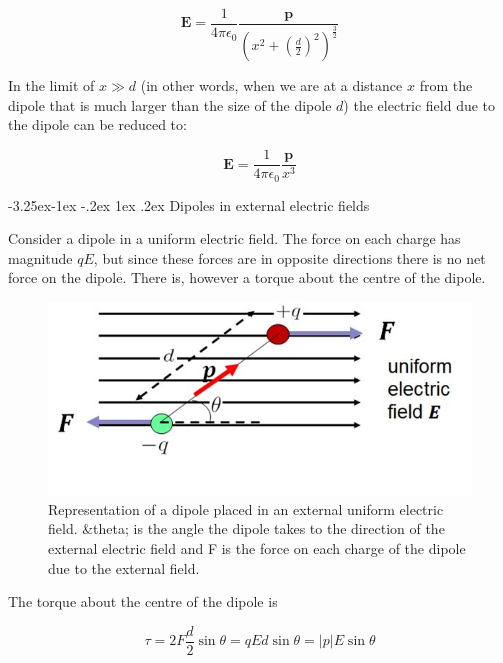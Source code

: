 \documentclass[
]{book}
\makeatletter
\renewcommand\subsection{%
\@startsection{subsection}{2}{\z@}%
              {-3.25ex\@plus -1ex \@minus -.2ex}%
              {1ex \@plus .2ex}%
              {\sffamily\bfseries}}
\numberwithin{equation}{section}
\makeatother
\begin{document}
\begin{equation}
\label{eq:fieldatPdipole}
\mathbf{E} = \frac{1}{4 \pi \epsilon_0} \frac{\mathbf{p}}{\left( x^2 + \left( \frac{d}{2} \right)^2 \right)^{\frac{3}{2}}}
\end{equation}

In the limit of \(x \gg d\) (in other words, when we are at a distance \(x\)
from the dipole that is much larger than the size of the dipole \(d\)) the
electric field due to the dipole can be reduced to:

\begin{equation}
\label{eq:EvsP}
\mathbf{E} = \frac{1}{4\pi \epsilon_0} \frac{\mathbf{p}}{x^3}
\end{equation}

\hypertarget{dipoles-in-external-electric-fields}{%
\subsection{Dipoles in external electric fields}\label{dipoles-in-external-electric-fields}}

Consider a dipole in a uniform electric field. The force on each charge
has magnitude \(qE\), but since these forces are in opposite directions
there is no net force on the dipole. There is, however a torque about
the centre of the dipole.

\begin{figure}

{\centering \includegraphics[width=0.7\linewidth]{Figures/dipole_extE} 

}

\caption{Representation of a dipole placed in an external uniform electric field. &theta; is the angle the dipole takes to the direction of the external electric field and F is the force on each charge of the dipole due to the external field.}\label{fig:dipoleExtE}
\end{figure}

The torque about the centre of the dipole is

\begin{equation}
\label{eq:torqueDipole}
\tau = 2 F \frac{d}{2} \sin\theta = q E d \sin\theta = |p|E \sin\theta
\end{equation}
\end{document}
